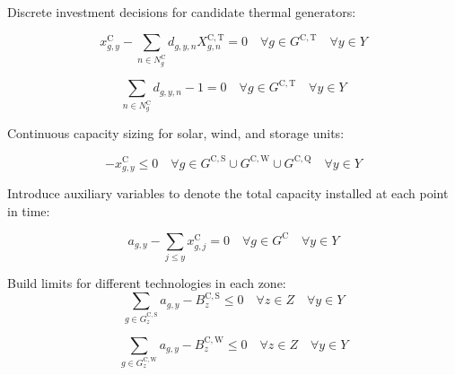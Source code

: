 \documentclass{article}
\newcommand{\sGeneratorsCandidate}{G^{\mathrm{C}}}
\newcommand{\sGeneratorsCandidateThermal}{G^{\mathrm{C,T}}}
\newcommand{\sGeneratorsCandidateWind}{G^{\mathrm{C,W}}}
\newcommand{\sGeneratorsCandidateSolar}{G^{\mathrm{C,S}}}
\newcommand{\sStorageCandidate}{G^{\mathrm{C,Q}}}
\newcommand{\sYears}{Y}
\newcommand{\sZones}{Z}
\newcommand{\sInvestmentSizeOptions}{N^{\mathrm{C}}}
\newcommand{\sInvestmentSizeOptionsGenerator}[1][\iGenerator]{\sInvestmentSizeOptions_{#1}}
\newcommand{\iGenerator}{g}
\newcommand{\iYear}{y}
\newcommand{\iYearAlias}{j}
\newcommand{\iZone}{z}
\newcommand{\iInvestmentSizeOption}{n}
\newcommand{\cInvestmentSize}{X^{\mathrm{C,T}}_{\iGenerator,\iInvestmentSizeOption}}
\newcommand{\cBuildLimitWind}{B^{\mathrm{C,\mathrm{W}}}_{\iZone}}
\newcommand{\cBuildLimitSolar}{B^{\mathrm{C,\mathrm{S}}}_{\iZone}}
\newcommand{\vInstalledCapacity}[1][\iGenerator,\iYear]{x^{\mathrm{C}}_{#1}}
\newcommand{\vInvestmentSizeIndicator}[1][\iGenerator,\iYear,\iInvestmentSizeOption]{d_{#1}}
\newcommand{\vInstalledCapacityTotal}[1][\iGenerator,\iYear]{a_{#1}}
\begin{document}
Discrete investment decisions for candidate thermal generators:

\begin{equation}
\vInstalledCapacity - \sum\limits_{\iInvestmentSizeOption \in \sInvestmentSizeOptionsGenerator} \vInvestmentSizeIndicator \cInvestmentSize = 0 \quad \forall \iGenerator \in \sGeneratorsCandidateThermal \quad \forall \iYear \in \sYears 
\label{eqn: candidate thermal unit capacity}
\end{equation}

\begin{equation}
\sum\limits_{\iInvestmentSizeOption \in \sInvestmentSizeOptionsGenerator} \vInvestmentSizeIndicator - 1 = 0 \quad \forall \iGenerator \in \sGeneratorsCandidateThermal \quad \forall \iYear \in \sYears
\label{eqn: capacity thermal unit discrete size option - single choice}
\end{equation}

Continuous capacity sizing for solar, wind, and storage units:

\begin{equation}
- \vInstalledCapacity[\iGenerator,\iYear] \leq 0 \quad \forall \iGenerator \in \sGeneratorsCandidateSolar \cup \sGeneratorsCandidateWind \cup \sStorageCandidate \quad \forall \iYear \in \sYears
\label{eqn: non negative investment capacity}
\end{equation}

Introduce auxiliary variables to denote the total capacity installed at each point in time:

\begin{equation}
	\vInstalledCapacityTotal - \sum\limits_{\iYearAlias \leq \iYear} \vInstalledCapacity[\iGenerator,\iYearAlias] = 0 \quad \forall \iGenerator \in \sGeneratorsCandidate \quad \forall \iYear \in \sYears
\end{equation}

Build limits for different technologies in each zone:
\begin{equation}
\sum\limits_{\iGenerator \in \sGeneratorsCandidateSolar_{\iZone}} \vInstalledCapacityTotal - \cBuildLimitSolar \leq 0 \quad \forall \iZone \in \sZones \quad \forall \iYear \in \sYears
\end{equation}

\begin{equation}
\sum\limits_{\iGenerator \in \sGeneratorsCandidateWind_{\iZone}} \vInstalledCapacityTotal - \cBuildLimitWind \leq 0 \quad \forall \iZone \in \sZones \quad \forall \iYear \in \sYears 
\end{equation}
\end{document}
